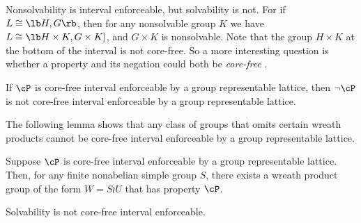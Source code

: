 \begin{frame}[label=IEPropsConjecture]{}
Nonsolvability is interval enforceable, but solvability is not. 
\vskip4mm
For if $L\cong \lb H, G \rb$, then for any nonsolvable 
group $K$ we have $L\cong \lb H\times K, G\times K]$, and $G\times K$ is
nonsolvable.  
\vskip4mm
Note that the group $H\times K$ at the bottom of
the interval is not core-free.  So a more interesting question is whether a
property and its negation could both be \emph{core-free} \IE.  
\vskip4mm
\begin{conjecture}
\label{conjecture:isle-prop2}
If $\cP$ is core-free interval enforceable by a group representable lattice,
then $\neg \cP$ is not core-free interval enforceable by a group representable lattice.
\end{conjecture}
\end{frame}

\begin{frame}[label=IEPropsLemma2]{}
The following lemma shows that 
any class of groups that omits certain wreath products cannot be core-free
interval enforceable by a group representable lattice. 
\vskip4mm
\begin{lemma}
Suppose $\cP$ is core-free interval enforceable by a group
representable lattice.   
Then, for any finite nonabelian simple group $S$, there exists a wreath product group
of the form $W = S\wr U$ that has property $\cP$. 
\end{lemma}
\vskip4mm
\begin{corollary}
Solvability is not core-free interval enforceable.
\end{corollary}
\end{frame}

